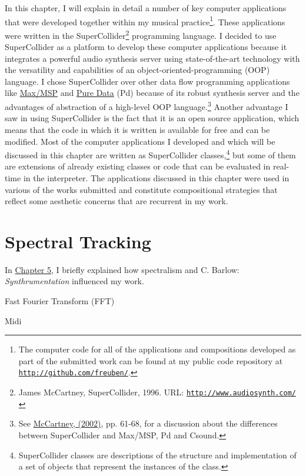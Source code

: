 In this chapter, I will explain in detail a number of key computer applications that were developed together within my musical practice\footnote{The computer code for all of the applications and compositions developed as part of the submitted work can be found at my public code repository at \href{http://github.com/freuben/}{\texttt{http://github.com/freuben/}}.}. These applications were written in the \mbox{SuperCollider}\footnote{James McCartney, SuperCollider, 1996. URL: \href{http://www.audiosynth.com/}{\texttt{http://www.audiosynth.com/}}} programming language. I decided to use SuperCollider as a platform to develop these computer applications because it integrates a powerful audio synthesis server using state-of-the-art technology with the versatility and capabilities of an object-oriented-programming (OOP) language. I chose SuperCollider over other data flow programming applications like \href{http://www.cycling74.com/}{Max/MSP} and \href{http://puredata.info/}{Pure Data} (Pd) because of its robust synthesis server and the advantages of abstraction of a high-level OOP language.\footnote{See \hyperlink{mccartney}{McCartney, (2002)}, pp. 61-68, for a discussion about the differences between SuperCollider and Max/MSP, Pd and Csound.} Another advantage I saw in using SuperCollider is the fact that it is an open source application, which means that the code in which it is written is available for free and can be modified. Most of the computer applications I developed and which will be discussed in this chapter are written as SuperCollider classes,\footnote{SuperCollider classes are descriptions of the structure and implementation of a set of objects that represent the instances of the class.} but some of them are extensions of already existing classes or code that can be evaluated in real-time in the interpreter. The applications discussed in this chapter were used in various of the works submitted and constitute compositional strategies that reflect some aesthetic concerns that are recurrent in my work.

\section{Spectral Tracking}

In \hyperlink{chapter5}{Chapter 5}, I briefly explained how spectralism and C. Barlow: \emph{Synthrumentation} influenced my work.

Fast Fourier Transform (FFT)


Midi

